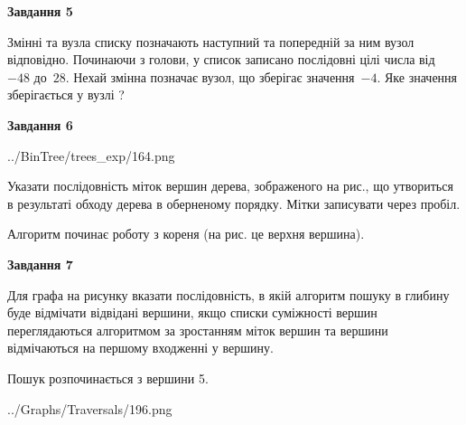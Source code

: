 \documentclass[12pt, ukrainian]{article}
\begin{document}
{\begin {large}
{\begin {center}\textbf{Завдання 5}\end {center}}\par
Змінні  та  вузла списку позначають наступний та попередній за ним вузол відповідно. Починаючи з голови, у список записано послідовні цілі числа від~$-48$ до~$28$. Нехай змінна  позначає вузол, що зберігає значення~$-4$.
Яке значення зберігається у вузлі  ?\par
\newpage

{\begin {center}\textbf{Завдання 6}\end {center}}\par

\begin{center}
	{../BinTree/trees_exp/164.png}
\end{center}
Указати послідовність міток вершин дерева, зображеного на рис., що утвориться в результаті обходу дерева в оберненому порядку. Мітки записувати через пробіл.\par Алгоритм починає роботу з кореня (на рис. це верхня вершина).\par
\newpage

{\begin {center}\textbf{Завдання 7}\end {center}}\par
Для графа на рисунку вказати послідовність, в якій алгоритм пошуку в глибину буде відмічати відвідані вершини, якщо списки суміжності вершин переглядаються алгоритмом за зростанням міток вершин та вершини відмічаються на першому вход\-женні у вершину.\par
Пошук розпочинається з вершини 5.\par

\begin{center}
	{../Graphs/Traversals/196.png}
\end{center}\par
\newpage


\end{large}}
\end{document}
